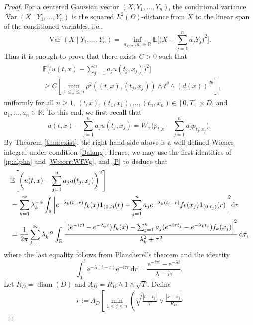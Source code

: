 \documentclass[reqno]{amsart}
\DeclareMathOperator{\Var}{Var}
\DeclareMathOperator{\diam}{diam}
\newcommand{\R}{\mathbb R}
\newcommand{\E}{\mathbb E}
\renewcommand{\d}{\mathrm d}
\newcommand{\e}{\mathrm e}
\newcommand{\1}{\mathbf 1}
\numberwithin{equation}{section}
\theoremstyle{definition}
\begin{document}
\begin{proof}
For a centered Gaussian vector $(X,Y_1,\dots, Y_n)$, the conditional variance $\Var(X\mid Y_1,\dots,Y_n)$ is the squared \(L^2(\Omega)\)-distance from $X$ to the linear span of the conditioned variables, i.e.,
\[
	\Var(X\mid Y_1,\dots,Y_n) =\inf_{a_1,\dots, a_n \in \R}\E\Bigg[\bigg(X-\sum_{j=1}^n a_jY_j\bigg)^2\Bigg].
\]
Thus it is enough to prove that there exists $C>0$ such that
\begin{align}\begin{split}\label{SLND:claim}
	&\E\Bigg[\bigg(u(t,x)-\sum_{j=1}^n a_j u(t_j,x_j)\bigg)^2\Bigg]\\
	& \ge C \left[ \min_{1\le j\le n}
        \rho^2((t,x),(t_j,x_j))
        \wedge t^{\theta}
        \wedge (d(x))^{2\theta}\right],
\end{split}\end{align}
uniformly for all $n \ge 1$, $(t,x),(t_1,x_1),\dots, (t_n,x_n) \in [0,T] \times D$, and $a_1,\dots, a_n \in \R$.
To this end, we first recall that
\[
	u(t,x)-\sum_{j=1}^n a_j u(t_j,x_j) = W_\alpha\bigg( p_{t,x} - \sum_{j=1}^n a_j p_{t_j,x_j}\bigg).
\]
By Theorem \ref{thm:exist}, the right-hand side above is a well-defined Wiener integral under condition \eqref{Dalang}.
Hence, we may use the first identities of \eqref{ip:alpha} and \eqref{W:corr:WfWg}, and \eqref{P} to deduce that 
\begin{align}\label{eq:Fourier}
&\E\Bigg[\bigg(u(t,x)-\sum_{j=1}^n a_j u(t_j,x_j)\bigg)^2\Bigg]\\
&= \sum_{k=1}^\infty \lambda_k^{-\alpha} \int_\R \bigg| e^{-\lambda_k (t-r)} f_k(x) {\bf 1}_{(0,t)}(r) - \sum_{j=1}^n a_j e^{-\lambda_k (t_j-r)} f_k(x_j) {\bf 1}_{(0,t_j)}(r) \bigg|^2 \d r \notag\\
&=
    \frac1{2\pi}
    \sum_{k=1}^\infty \lambda_k^{-\alpha}
    \int_\R
    \frac{\left|
        (e^{-i\tau t}-e^{-\lambda_k t})f_k(x)
        -\sum_{j=1}^n a_j
        (e^{-i\tau t_j}-e^{-\lambda_k t_j})f_k(x_j)
    \right|^2}
    {\lambda_k^2+\tau^2}\,\d\tau, \notag
\end{align}
where the last equality follows from Plancherel's theorem and the identity
\[
    \int_0^t \e^{-\lambda(t-r)}\e^{-i\tau r}\,\d r
    =
    \frac{\e^{-i\tau t}-\e^{-\lambda t}}{\lambda-i\tau}.
\]
Let \(R_D=\diam(D)\) and \(A_D=R_D\wedge1\wedge\sqrt T\). 
Define
\begin{align}\label{SLND:r}
    r
    :=
    A_D
    \left[
        \min_{1\le j\le n}
        \left(
            \sqrt{\frac{|t-t_j|}{T}}
            \vee
            \frac{|x-x_j|}{R_D}

\end{align}
\end{proof}
\end{document}
